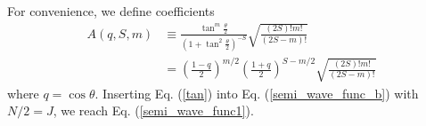 \documentclass[%
superscriptaddress,
preprint,
showpacs,
nofootinbib,
amsmath,amssymb,
aps,
prc,
floatfix ]%
{revtex4-1}
\begin{document}
For convenience, we define coefficients
\begin{align}
  A(q,S,m) &\equiv 
  \frac{\tan^m{\frac{\theta}{2}}}{\left(1+\tan^2{\frac{\theta}{2}}\right)^{-S}}
  \sqrt{\frac{(2S)!m!}{(2S-m)!}}  \nonumber \\
  &= \left(\frac{1-q}{2}\right)^{m/2}\left(\frac{1+q}{2}\right)^{S-m/2} \sqrt{\frac{(2S)!m!}{(2S-m)!}}
\label{tan}
\end{align}
where $q=\cos{\theta}$.
Inserting Eq. (\ref{tan}) into Eq. (\ref{semi_wave_func_b}) with $N/2=J$,
we reach Eq. (\ref{semi_wave_func1}).



\end{document}
